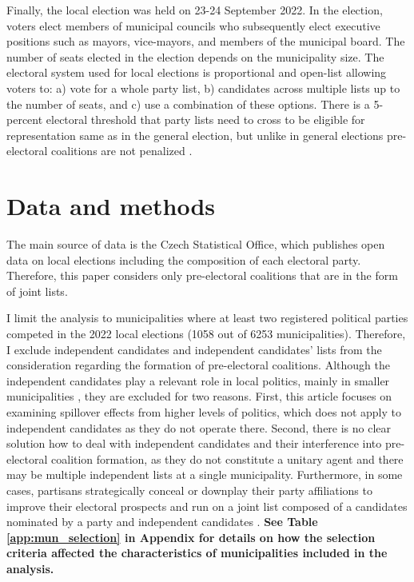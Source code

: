\documentclass[]{interact}
\theoremstyle{plain}%
\theoremstyle{definition}
\theoremstyle{remark}
\begin{document}
Finally, the local election was held on 23-24 September 2022. In the election, voters elect members of municipal councils who subsequently elect executive positions such as mayors, vice-mayors, and members of the municipal board. The number of seats elected in the election depends on the municipality size. The electoral system used for local elections is proportional and open-list allowing voters to: a) vote for a whole party list, b) candidates across multiple lists up to the number of seats, and c) use a combination of these options. There is a 5-percent electoral threshold that party lists need to cross to be eligible for representation same as in the general election, but unlike in general elections pre-electoral coalitions are not penalized \citep{voda2022}. 

\section{Data and methods}

The main source of data is the Czech Statistical Office, which publishes open data on local elections including the composition of each electoral party. Therefore, this paper considers only pre-electoral coalitions that are in the form of joint lists. 

I limit the analysis to municipalities where at least two registered political parties competed in the 2022 local elections (1058 out of 6253 municipalities). Therefore, I exclude independent candidates and independent candidates' lists from the consideration regarding the formation of pre-electoral coalitions. Although the independent candidates play a relevant role in local politics, mainly in smaller municipalities \citep{kostelecky2023}, they are excluded for two reasons. First, this article focuses on examining spillover effects from higher levels of politics, which does not apply to independent candidates as they do not operate there. Second, there is no clear solution how to deal with independent candidates and their interference into pre-electoral coalition formation, as they do not constitute a unitary agent and there may be multiple independent lists at a single municipality. Furthermore, in some cases, partisans strategically conceal or downplay their party affiliations to improve their electoral prospects and run on a joint list composed of a candidates nominated by a party and independent candidates \citep[503]{kostelecky2023,gendzwill2012}. %
\textbf{See Table \ref{app:mun_selection} in Appendix for details on how the selection criteria affected the characteristics of municipalities included in the analysis.}
\end{document}
